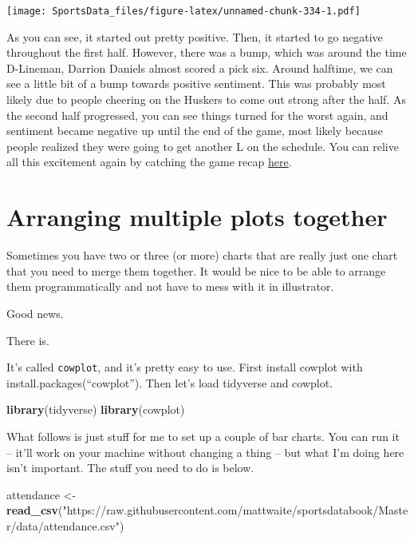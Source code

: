 \documentclass[
]{book}
\newenvironment{Shaded}{\begin{snugshade}}{\end{snugshade}}
\newcommand{\KeywordTok}[1]{\textcolor[rgb]{0.13,0.29,0.53}{\textbf{#1}}}
\newcommand{\NormalTok}[1]{#1}
\newcommand{\StringTok}[1]{\textcolor[rgb]{0.31,0.60,0.02}{#1}}
\begin{document}
\texttt{[image: SportsData\_files/figure-latex/unnamed-chunk-334-1.pdf]}

As you can see, it started out pretty positive. Then, it started to go negative throughout the first half. However, there was a bump, which was around the time D-Lineman, Darrion Daniels almost scored a pick six. Around halftime, we can see a little bit of a bump towards positive sentiment. This was probably most likely due to people cheering on the Huskers to come out strong after the half. As the second half progressed, you can see things turned for the worst again, and sentiment became negative up until the end of the game, most likely because people realized they were going to get another L on the schedule. You can relive all this excitement again by catching the game recap \href{https://www.youtube.com/watch?v=m0hKH6Zb0vY\&feature=onebox}{here}.

\hypertarget{arranging-multiple-plots-together}{%
\chapter{Arranging multiple plots together}\label{arranging-multiple-plots-together}}

Sometimes you have two or three (or more) charts that are really just one chart that you need to merge them together. It would be nice to be able to arrange them programmatically and not have to mess with it in illustrator.

Good news.

There is.

It's called \texttt{cowplot}, and it's pretty easy to use. First install cowplot with install.packages(``cowplot''). Then let's load tidyverse and cowplot.

\begin{Shaded}
\begin{Highlighting}[]
\KeywordTok{library}\NormalTok{(tidyverse)}
\KeywordTok{library}\NormalTok{(cowplot)}
\end{Highlighting}
\end{Shaded}

What follows is just stuff for me to set up a couple of bar charts. You can run it -- it'll work on your machine without changing a thing -- but what I'm doing here isn't important. The stuff you need to do is below.

\begin{Shaded}
\begin{Highlighting}[]
\NormalTok{attendance <-}\StringTok{ }\KeywordTok{read_csv}\NormalTok{(}\StringTok{"https://raw.githubusercontent.com/mattwaite/sportsdatabook/Master/data/attendance.csv"}\NormalTok{)}
\end{Highlighting}
\end{Shaded}
\end{document}

